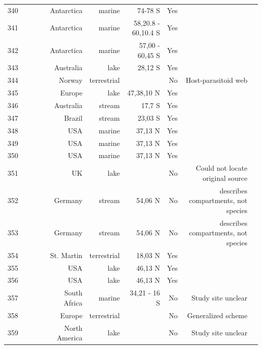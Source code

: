 \documentclass[12pt]{article}
\begin{document}
\begin{landscape}
\begin{table}[h!]
\begin{tabular}{rrrrrrrrr}
      340   & ~\citet{GlobalWeb} & ~\citet{Smith2007} & Antarctica & marine & 74-78 S & Yes   &       &  \\
      341   & ~\citet{GlobalWeb} & ~\citet{Lancraft1991} & Antarctica & marine & 58,20.8 - 60,10.4 S & Yes   &       &  \\
      342   & ~\citet{GlobalWeb} & ~\citet{Hopkins1993} & Antarctica & marine & 57,00 - 60,45 S & Yes   &       &  \\
      343   & ~\citet{GlobalWeb} & ~\citet{Kitching1987} & Australia & lake  & 28,12 S & Yes   &       &  \\
      344   & ~\citet{GlobalWeb} & ~\citet{Hodkinson2004} & Norway & terrestrial &       & No    & Host-parasitoid web &  \\
      345   & ~\citet{GlobalWeb} & ~\citet{Boit2012} & Europe & lake  & 47,38,10 N & Yes   &       &  \\
      346   & ~\citet{GlobalWeb} & ~\citet{Rayner2010} & Australia & stream & 17,7 S & Yes   &       &  \\
      347   & ~\citet{GlobalWeb} & ~\citet{Motta2005} & Brazil & stream & 23,03 S & Yes   &       &  \\
      348   & ~\citet{GlobalWeb} & ~\citet{Douglass2011} & USA   & marine & 37,13 N & Yes   &       &  \\
      349   & ~\citet{GlobalWeb} & ~\citet{Douglass2011} & USA   & marine & 37,13 N & Yes   &       &  \\
      350   & ~\citet{GlobalWeb} & ~\citet{Douglass2011} & USA   & marine & 37,13 N & Yes   &       &  \\
      351   & ~\citet{GlobalWeb} & ~\citet{Warren1989} & UK    & lake  &       & No    & Could not locate original source &  \\
      352   & ~\citet{GlobalWeb} & ~\citet{Poepperl2003} & Germany & stream & 54,06 N & No    & describes compartments, not species &  \\
      353   & ~\citet{GlobalWeb} & ~\citet{Poepperl2003} & Germany & stream & 54,06 N & No    & describes compartments, not species &  \\
      354   & ~\citet{GlobalWeb} & ~\citet{Goldwasser1993} & St. Martin & terrestrial & 18,03 N & Yes   &       &  \\
      355   & ~\citet{GlobalWeb} & ~\citet{Cohen2003} & USA   & lake  & 46,13 N & Yes   &       &  \\
      356   & ~\citet{GlobalWeb} & ~\citet{Cohen2003} & USA   & lake  & 46,13 N & Yes   &       &  \\
      357   & ~\citet{GlobalWeb} & ~\citet{Yodzis1998} & South Africa & marine & 34,21 - 16 S & No    & Study site unclear &  \\
      358   & ~\citet{GlobalWeb} & ~\citet{Schroter2003} & Europe & terrestrial &       & No    & Generalized scheme &  \\
      359   & ~\citet{GlobalWeb} & ~\citet{Baiser2012} & North America & lake  &       & No    & Study site unclear &  \\
      \hline
    \end{tabular}%
  \end{table}%


\end{landscape}
\end{document}
